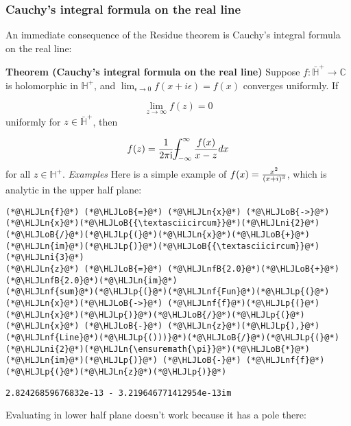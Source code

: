 \documentclass[12pt,landscape]{article}
\newcommand{\HLJLn}[1]{#1}
\newcommand{\HLJLnf}[1]{\textcolor[RGB]{66,102,213}{#1}}
\newcommand{\HLJLnfB}[1]{\textcolor[RGB]{59,151,46}{#1}}
\newcommand{\HLJLni}[1]{\textcolor[RGB]{59,151,46}{#1}}
\newcommand{\HLJLoB}[1]{\textcolor[RGB]{102,102,102}{\textbf{#1}}}
\newcommand{\HLJLp}[1]{#1}
\def\I{ {\rm i} }
\def\Xint#1{ \mathchoice
   {\XXint\displaystyle\textstyle{#1} }%
   {\XXint\textstyle\scriptstyle{#1} }%
   {\XXint\scriptstyle\scriptscriptstyle{#1} }%
   {\XXint\scriptscriptstyle\scriptscriptstyle{#1} }%
   \!\int}
\def\XXint#1#2#3{ {\setbox0=\hbox{$#1{#2#3}{\int}$}
     \vcenter{\hbox{$#2#3$}}\kern-.5\wd0} }
\def\dashint{\Xint-}
\def\infdashint{\dashint_{-\infty}^\infty}
\begin{document}
{\newpage
\subsubsection{Cauchy's integral formula on the real line}
An immediate consequence of the Residue theorem is Cauchy's integral formula on the real line:

\textbf{Theorem (Cauchy's integral formula on the real line)} Suppose $f : \bar {\mathbb H}^+  \rightarrow {\mathbb C}$ is holomorphic in ${\mathbb H}^+ $, and  $\lim_{\epsilon \rightarrow 0} f(x + i \epsilon) = f(x)$ converges uniformly.  If

\[
\lim_{z \rightarrow \infty} f(z) = 0
\]
uniformly for $z \in \bar {\mathbb H}^+$, then

\[
f(z) = {1 \over 2 \pi \I} \infdashint {f(x) \over x - z} dx
\]
for all  $z \in {\mathbb H}^+$.
\newpage
\emph{Examples} Here is a simple example of $f(x) = {x^2 \over (x+ i)^3}$, which is analytic in the upper half plane:


\begin{lstlisting}
(*@\HLJLn{f}@*) (*@\HLJLoB{=}@*) (*@\HLJLn{x}@*) (*@\HLJLoB{->}@*) (*@\HLJLn{x}@*)(*@\HLJLoB{{\textasciicircum}}@*)(*@\HLJLni{2}@*)(*@\HLJLoB{/}@*)(*@\HLJLp{(}@*)(*@\HLJLn{x}@*)(*@\HLJLoB{+}@*)(*@\HLJLn{im}@*)(*@\HLJLp{)}@*)(*@\HLJLoB{{\textasciicircum}}@*)(*@\HLJLni{3}@*)
(*@\HLJLn{z}@*) (*@\HLJLoB{=}@*) (*@\HLJLnfB{2.0}@*)(*@\HLJLoB{+}@*)(*@\HLJLnfB{2.0}@*)(*@\HLJLn{im}@*)
(*@\HLJLnf{sum}@*)(*@\HLJLp{(}@*)(*@\HLJLnf{Fun}@*)(*@\HLJLp{(}@*)(*@\HLJLn{x}@*)(*@\HLJLoB{->}@*) (*@\HLJLnf{f}@*)(*@\HLJLp{(}@*)(*@\HLJLn{x}@*)(*@\HLJLp{)}@*)(*@\HLJLoB{/}@*)(*@\HLJLp{(}@*)(*@\HLJLn{x}@*) (*@\HLJLoB{-}@*) (*@\HLJLn{z}@*)(*@\HLJLp{),}@*) (*@\HLJLnf{Line}@*)(*@\HLJLp{()))}@*)(*@\HLJLoB{/}@*)(*@\HLJLp{(}@*)(*@\HLJLni{2}@*)(*@\HLJLn{\ensuremath{\pi}}@*)(*@\HLJLoB{*}@*)(*@\HLJLn{im}@*)(*@\HLJLp{)}@*) (*@\HLJLoB{-}@*) (*@\HLJLnf{f}@*)(*@\HLJLp{(}@*)(*@\HLJLn{z}@*)(*@\HLJLp{)}@*)
\end{lstlisting}

\begin{lstlisting}
2.82426859676832e-13 - 3.219646771412954e-13im
\end{lstlisting}


Evaluating in lower half plane doesn't work because it has a pole there:


}
\end{document}
